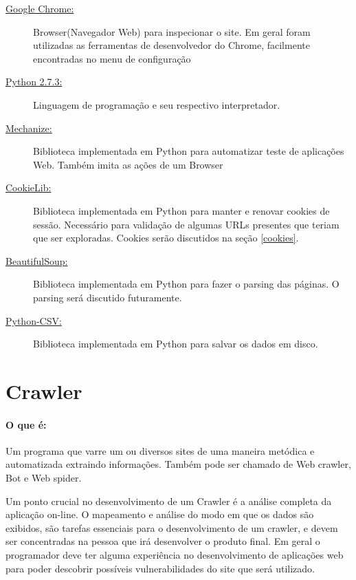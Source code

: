 \documentclass[a4paper, 12pt]{article}
\begin{document}
\begin{description}
\item[\href{https://www.google.com/intl/en/chrome/browser/}{Google
    Chrome:}\label{chrome}]{Browser(Navegador Web) para inspecionar o
  site. Em geral foram utilizadas as ferramentas de desenvolvedor do
  Chrome, facilmente encontradas no menu de configuração}
\item[\href{http://www.python.org/}{Python 2.7.3:}\label{python}]{Linguagem de programação e seu
    respectivo interpretador.}
\item[\href{http://wwwsearch.sourceforge.net/mechanize/}{Mechanize:}\label{mechanize}]{Biblioteca implementada em Python
    para automatizar teste de aplicações Web. Também imita as ações de
  um Browser}
\item[\href{http://docs.python.org/library/cookielib.html}{CookieLib:}\label{cookielib}]{Biblioteca implementada em Python para
  manter e renovar cookies de sessão. Necessário para validação de
  algumas URLs presentes que teriam que ser exploradas. Cookies serão
  discutidos na seção \ref{cookies}.}
\item[\href{http://www.crummy.com/software/BeautifulSoup/}{BeautifulSoup:}\label{bs}]{Biblioteca implementada em Python para
  fazer o parsing das páginas. O parsing será discutido futuramente.}
\item[\href{http://docs.python.org/library/csv.html}{Python-CSV:}\label{csv}]{Biblioteca implementada em Python para
  salvar os dados em disco.}
\end{description}


\section{Crawler} \label{crawler}

\paragraph{O que é:}\label{crawlerdesc}Um programa que varre um ou
diversos sites de uma maneira metódica e automatizada extraindo
informações. Também pode ser chamado de Web crawler, Bot e Web spider.

Um ponto crucial no desenvolvimento de um Crawler é a
análise completa da aplicação on-line. O mapeamento e análise do modo
em que os dados são exibidos, são tarefas essenciais para o
desenvolvimento de um crawler, e devem ser concentradas na
pessoa que irá desenvolver o produto final. Em geral o programador
deve ter alguma experiência no desenvolvimento de aplicações web para
poder descobrir possíveis vulnerabilidades do site que será utilizado.
\end{document}
